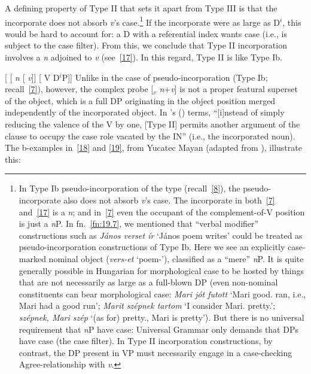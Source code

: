 \documentclass[output=paper]{langsci/langscibook}
\begin{document}
\begin{refcontext}
A defining property of Type II that sets it apart from Type III is that the incorporate does not
absorb \emph{v}'s case.\footnote{In Type Ib pseudo-incorporation of the
     type (recall~\ref{8}), the pseudo-incorporate also does not absorb
\emph{v}'s case. The incorporate in both~\eqref{7} and~\eqref{17} is a \emph{n}; and in~\eqref{7} even the occupant of the complement-of-V position is
just a \emph{n}P. In fn.\ \ref{fn:19.7}, we mentioned that  \enquote{verbal modifier}
constructions such as \emph{János verset ír} \enquote*{János poem writes} could be
treated as pseudo-incorporation constructions of Type Ib. Here we see an
explicitly case-marked nominal object (\emph{vers-et} \enquote*{poem-\Acc{}}),
classified as a \enquote{mere} \emph{n}P. It is quite generally possible in
Hungarian for morphological case to be hosted by things that are not
necessarily as large as a full-blown DP (even non-nominal constituents can bear
morphological case: \emph{Mari jót futott} \enquote*{Mari good.\Acc{} ran,
i.e., Mari had a good run}; \emph{Marit szépnek tartom} \enquote*{I consider
Mari.\Acc{} pretty.\Dat{}}; \emph{szépnek, Mari szép} \enquote*{(as for)
pretty.\Dat{}, Mari is pretty}). But there is no universal requirement
that \emph{n}P have case: Universal Grammar only demands that DPs have case
(the case filter). In Type II incorporation constructions, by contrast, the DP
present in VP must necessarily engage in a case-checking
Agree-relationship
with \emph{v}.\label{fn:19.13}} If the incorporate were as large as D$^i$, this would be hard
to account for: a D with a referential index wants case (i.e., is subject to
the case filter). From this, we conclude that Type II incorporation involves a
\emph{n} adjoined to \emph{v} (see~\ref{17}). In this regard, Type II is like
Type Ib.

\ea  {}[ [ \emph{n}\tss{\{[+N]\}} [ \hspace{-.7ex}\emph{v}\tss{\{[+V], \Acc{}, \ldots{}\}}]]\tss{\{\{[+N]\}, \{[+V], \Acc{}, \ldots{}\}\}} [ V D$^i$P]]\label{17}
\z
Unlike in the case of pseudo-incorporation (Type Ib; recall~\ref{7}),
however, the complex probe [$_v$ \emph{n}+\emph{v}] is not a proper featural
superset of the object, which is a full DP originating in the object position
merged independently of the incorporated object. In \citeauthor{mithun84}'s
(\citeyear[859]{mithun84}) terms, \enquote{[i]nstead of simply reducing the
valence of the V by one, [Type II] permits another argument of the clause to
occupy the case role vacated by the IN} (i.e., the incorporated noun). The
b-examples in~\eqref{18} and \eqref{19}, from Yucatec Mayan (adapted from
\citealt[858]{mithun84}), illustrate this:


\end{refcontext}
\end{document}

